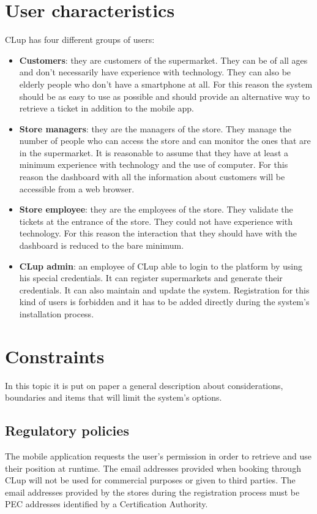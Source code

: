 \section{User characteristics}
CLup has four different groups of users:
\begin{itemize}
	\item \textbf{Customers}: they are customers of the supermarket. They can be of all ages and don't necessarily have experience with technology. They can also be elderly	people who don't have a smartphone at all. For this reason the system should be as easy to use as possible and should provide an alternative way to retrieve a ticket in addition to the mobile app.
	\item \textbf{Store managers}: they are the managers of the store. They manage the number of people who can access the store and can monitor the ones that are in the supermarket. It is reasonable to assume that they have at least a minimum experience with technology and the use of computer. For this reason the dashboard with all the information about customers will be accessible from a web browser.
	\item \textbf{Store employee}: they are the employees of the store. They validate the tickets at the entrance of the store. They could not have experience with technology. For this reason the interaction that they should have with the dashboard is reduced to the bare minimum.
    \item \textbf{CLup admin}: an employee of CLup able to login to the platform by using his special credentials. It can register supermarkets and generate their credentials. It can also maintain and update the system. Registration for this kind of users is forbidden and it has to be added directly during the system's installation process.
\end{itemize}

\section{Constraints}
In this topic it is put on paper a general description about considerations, boundaries and items that will limit the system's options.

\subsection{Regulatory policies}
The mobile application requests the user's permission in order to retrieve and use their position at runtime.\newline
The email addresses provided when booking through CLup will not be used for commercial purposes or given to third parties.\newline
The email addresses provided by the stores during the registration process must be PEC addresses identified by a Certification Authority.

